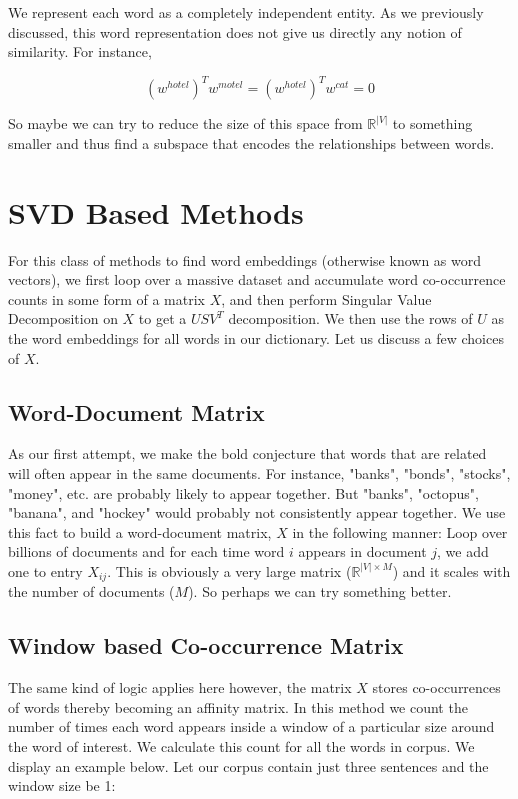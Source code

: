 \documentclass{tufte-handout}
\begin{document}

We represent each word as a completely independent entity. As we previously discussed, this word representation does not give us directly any notion of similarity. For instance,

$$(w^{hotel})^Tw^{motel} = (w^{hotel})^Tw^{cat} = 0$$

So maybe we can try to reduce the size of this space from $\mathbb{R}^|V|$ to something smaller and thus find a subspace that encodes the relationships between words.

\section{SVD Based Methods}\label{sec:svdmethods}

For this class of methods to find word embeddings (otherwise known as word vectors), we first loop over a massive dataset and accumulate word co-occurrence counts in some form of a matrix $X$, and then perform Singular Value Decomposition on $X$ to get a $USV^T$ decomposition. We then use the rows of $U$ as the word embeddings for all words in our dictionary. Let us discuss a few choices of $X$.

\subsection{Word-Document Matrix}
As our first attempt, we make the bold conjecture that words that are related will often appear in the same documents. For instance, "banks", "bonds", "stocks", "money", etc. are probably likely to appear together. But "banks", "octopus", "banana", and "hockey" would probably not consistently appear together. We use this fact to build a word-document matrix, $X$ in the following manner: Loop over billions of documents and for each time word $i$ appears in document $j$, we add one to entry $X_{ij}$. This is obviously a very large matrix ($\mathbb{R}^{|V|\times M}$) and it scales with the number of documents ($M$). So perhaps we can try something better.

\subsection{Window based Co-occurrence Matrix}
The same kind of logic applies here however, the matrix $X$ stores co-occurrences of words thereby becoming an affinity matrix. In this method we count the number of times each word appears inside a window of a particular size around the word of interest. We calculate this count for all the words in corpus. We display an example below. Let our corpus contain just three sentences and the window size be 1:
\end{document}
